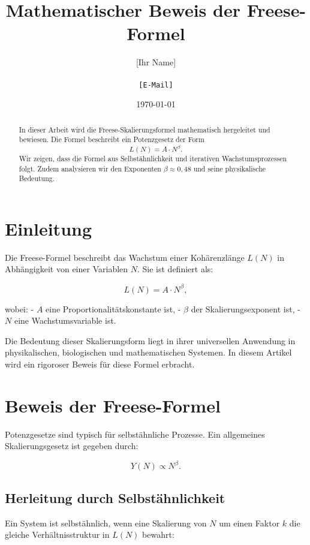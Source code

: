 \documentclass[a4paper,12pt]{article}
\title{Mathematischer Beweis der Freese-Formel}
\author{[Ihr Name] \\ [Institution] \\ \texttt{[E-Mail]}}
\date{\today}
\begin{document}
\maketitle

\begin{abstract}
In dieser Arbeit wird die Freese-Skalierungsformel mathematisch hergeleitet und bewiesen. Die Formel beschreibt ein Potenzgesetz der Form 
\[
L(N) = A \cdot N^\beta.
\]
Wir zeigen, dass die Formel aus Selbstähnlichkeit und iterativen Wachstumsprozessen folgt. Zudem analysieren wir den Exponenten \( \beta \approx 0,48 \) und seine physikalische Bedeutung.
\end{abstract}

\section{Einleitung}
Die Freese-Formel beschreibt das Wachstum einer Kohärenzlänge \( L(N) \) in Abhängigkeit von einer Variablen \( N \). Sie ist definiert als:

\begin{equation}
    L(N) = A \cdot N^\beta,
\end{equation}

wobei:
- \( A \) eine Proportionalitätskonstante ist,
- \( \beta \) der Skalierungsexponent ist,
- \( N \) eine Wachstumsvariable ist.

Die Bedeutung dieser Skalierungsform liegt in ihrer universellen Anwendung in physikalischen, biologischen und mathematischen Systemen. In diesem Artikel wird ein rigoroser Beweis für diese Formel erbracht.

\section{Beweis der Freese-Formel}
Potenzgesetze sind typisch für selbstähnliche Prozesse. Ein allgemeines Skalierungsgesetz ist gegeben durch:

\begin{equation}
    Y(N) \propto N^\beta.
\end{equation}

\subsection{Herleitung durch Selbstähnlichkeit}
Ein System ist selbstähnlich, wenn eine Skalierung von \( N \) um einen Faktor \( k \) die gleiche Verhältnisstruktur in \( L(N) \) bewahrt:
\end{document}
